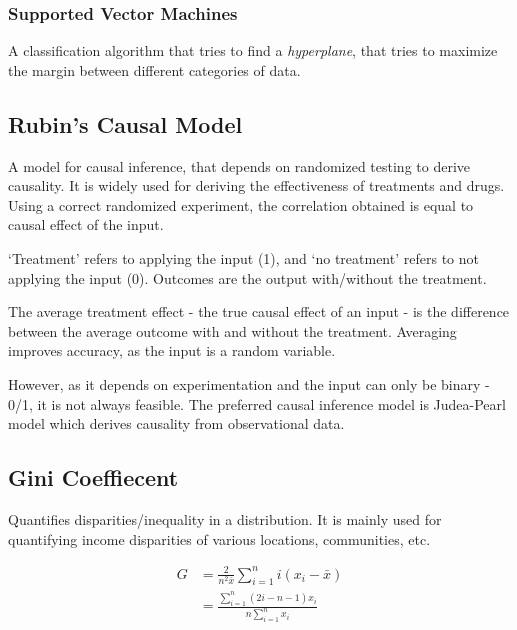 \documentclass[
  english,
  doc,floatsintext]{apa6}
\begin{document}
\hypertarget{supported-vector-machines}{%
\subsubsection{Supported Vector Machines}\label{supported-vector-machines}}

A classification algorithm that tries to find a \emph{hyperplane}, that tries to maximize the margin between different categories of data.

\hypertarget{rubins-causal-model}{%
\subsection{Rubin's Causal Model}\label{rubins-causal-model}}

A model for causal inference, that depends on randomized testing to derive causality. It is widely used for deriving the effectiveness of treatments and drugs. Using a correct randomized experiment, the correlation obtained is equal to causal effect of the input.

`Treatment' refers to applying the input (1), and `no treatment' refers to not applying the input (0). Outcomes are the output with/without the treatment.

The average treatment effect - the true causal effect of an input - is the difference between the average outcome with and without the treatment. Averaging improves accuracy, as the input is a random variable.

However, as it depends on experimentation and the input can only be binary - 0/1, it is not always feasible. The preferred causal inference model is Judea-Pearl model which derives causality from observational data.

\hypertarget{gini-coeffiecent}{%
\subsection{Gini Coeffiecent}\label{gini-coeffiecent}}

Quantifies disparities/inequality in a distribution. It is mainly used for quantifying income disparities of various locations, communities, etc.

\[
\begin{aligned}
G
&=\frac{2}{n^{2} \bar{x}} \sum\limits_{i=1}^{n} i\left(x_{i}-\bar{x}\right) \\
&=\frac{\sum\limits_{i=1}^{n}(2 i-n-1) x_{i}}{n \sum\limits_{i=1}^{n} x_{i}}
\end{aligned}
\]
\end{document}
